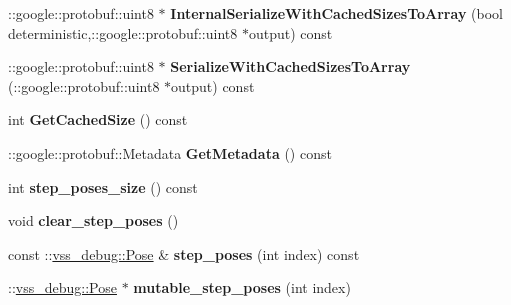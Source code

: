 \begin{DoxyCompactItemize}
\item 
\+::google\+::protobuf\+::uint8 $\ast$ {\bfseries Internal\+Serialize\+With\+Cached\+Sizes\+To\+Array} (bool deterministic,\+::google\+::protobuf\+::uint8 $\ast$output) const \hypertarget{classvss__debug_1_1Global__Debug_abb847501684155bc055ca799d08f47d1}{}\label{classvss__debug_1_1Global__Debug_abb847501684155bc055ca799d08f47d1}

\item 
\+::google\+::protobuf\+::uint8 $\ast$ {\bfseries Serialize\+With\+Cached\+Sizes\+To\+Array} (\+::google\+::protobuf\+::uint8 $\ast$output) const \hypertarget{classvss__debug_1_1Global__Debug_a3a1874f1c52542b90a998ae87c2369f3}{}\label{classvss__debug_1_1Global__Debug_a3a1874f1c52542b90a998ae87c2369f3}

\item 
int {\bfseries Get\+Cached\+Size} () const \hypertarget{classvss__debug_1_1Global__Debug_a9cf45894e108104b8c62cf42191a7082}{}\label{classvss__debug_1_1Global__Debug_a9cf45894e108104b8c62cf42191a7082}

\item 
\+::google\+::protobuf\+::\+Metadata {\bfseries Get\+Metadata} () const \hypertarget{classvss__debug_1_1Global__Debug_aeeb8bc302961fae9d1be8c2f0da2b492}{}\label{classvss__debug_1_1Global__Debug_aeeb8bc302961fae9d1be8c2f0da2b492}

\item 
int {\bfseries step\+\_\+poses\+\_\+size} () const \hypertarget{classvss__debug_1_1Global__Debug_a2d2e120072c0b10fb7f3862377f25742}{}\label{classvss__debug_1_1Global__Debug_a2d2e120072c0b10fb7f3862377f25742}

\item 
void {\bfseries clear\+\_\+step\+\_\+poses} ()\hypertarget{classvss__debug_1_1Global__Debug_a5422ecfa6c7dd05934486d28bac9dfa0}{}\label{classvss__debug_1_1Global__Debug_a5422ecfa6c7dd05934486d28bac9dfa0}

\item 
const \+::\hyperlink{classvss__debug_1_1Pose}{vss\+\_\+debug\+::\+Pose} \& {\bfseries step\+\_\+poses} (int index) const \hypertarget{classvss__debug_1_1Global__Debug_ae09e1405bd278bfaf13f5f7092da3f65}{}\label{classvss__debug_1_1Global__Debug_ae09e1405bd278bfaf13f5f7092da3f65}

\item 
\+::\hyperlink{classvss__debug_1_1Pose}{vss\+\_\+debug\+::\+Pose} $\ast$ {\bfseries mutable\+\_\+step\+\_\+poses} (int index)\hypertarget{classvss__debug_1_1Global__Debug_a420085f1ffc2ab1db6db07b942c3b4f3}{}\label{classvss__debug_1_1Global__Debug_a420085f1ffc2ab1db6db07b942c3b4f3}


\end{DoxyCompactItemize}
